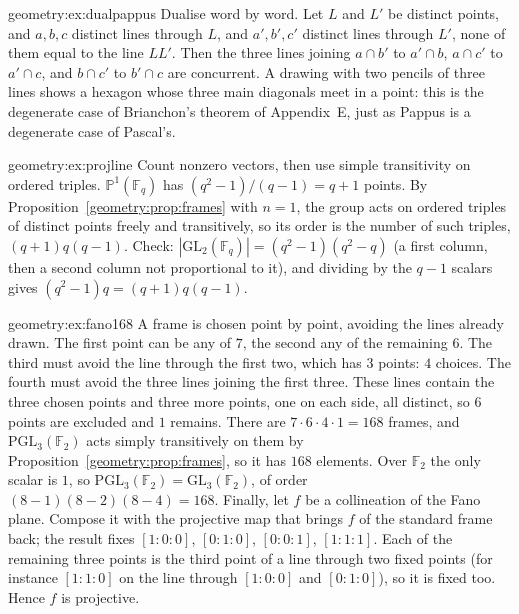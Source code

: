\begin{solution}{geometry:ex:dualpappus}
\idea Dualise word by word.
\writeup Let $L$ and $L'$ be distinct points, and $a,b,c$ distinct lines through $L$, and $a',b',c'$ distinct lines through $L'$, none of them
equal to the line $LL'$. Then the three lines joining $a\cap b'$ to $a'\cap b$, $a\cap c'$ to $a'\cap c$, and $b\cap c'$ to $b'\cap c$ are
concurrent. A drawing with two pencils of three lines shows a hexagon whose three main diagonals meet in a point: this is the degenerate case of
Brianchon's theorem of Appendix~E, just as Pappus is a degenerate case of Pascal's.
\end{solution}

\begin{solution}{geometry:ex:projline}
\idea Count nonzero vectors, then use simple transitivity on ordered triples.
\writeup $\mathbb P^1(\mathbb F_q)$ has $(q^2-1)/(q-1)=q+1$ points. By Proposition~\ref{geometry:prop:frames} with $n=1$, the group acts on ordered triples of
distinct points freely and transitively, so its order is the number of such triples, $(q+1)q(q-1)$. Check:
$|\mathrm{GL}_2(\mathbb F_q)|=(q^2-1)(q^2-q)$ (a first column, then a second column not proportional to it), and dividing by the $q-1$ scalars
gives $(q^2-1)q=(q+1)q(q-1)$.
\end{solution}

\begin{solution}{geometry:ex:fano168}
\idea A frame is chosen point by point, avoiding the lines already drawn.
\writeup The first point can be any of $7$, the second any of the remaining $6$. The third must avoid the line through the first two, which has
$3$ points: $4$ choices. The fourth must avoid the three lines joining the first three. These lines contain the three chosen points and
three more points, one on each side, all distinct, so $6$ points are excluded and $1$ remains. There are $7\cdot6\cdot4\cdot1=168$ frames, and
$\mathrm{PGL}_3(\mathbb F_2)$ acts simply transitively on them by Proposition~\ref{geometry:prop:frames}, so it has $168$ elements. Over $\mathbb F_2$
the only scalar is $1$, so $\mathrm{PGL}_3(\mathbb F_2)=\mathrm{GL}_3(\mathbb F_2)$, of order $(8-1)(8-2)(8-4)=168$. Finally, let $f$ be a
collineation of the Fano plane. Compose it with the projective map that brings $f$ of the standard frame back; the result fixes $[1:0:0]$,
$[0:1:0]$, $[0:0:1]$, $[1:1:1]$. Each of the remaining three points is the third point of a line through two fixed points (for instance
$[1:1:0]$ on the line through $[1:0:0]$ and $[0:1:0]$), so it is fixed too. Hence $f$ is projective.
\end{solution}

